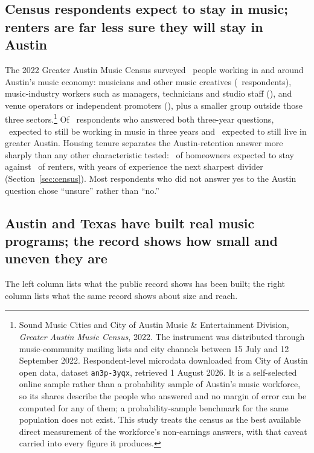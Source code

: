 \subsection*{Census respondents expect to stay in music; renters are far less sure they will stay in Austin}

The 2022 Greater Austin Music Census surveyed \NCensusNRespondents\ people
working in and around Austin's music economy: musicians and other music
creatives (\NCensusNSectorCreative\ respondents), music-industry workers such
as managers, technicians and studio staff (\NCensusNSectorIndustry), and venue
operators or independent promoters (\NCensusNSectorPresenter), plus a smaller
group outside those three sectors.\footnote{Sound Music Cities and City of
Austin Music \& Entertainment Division, \textit{Greater Austin Music Census},
2022. The instrument was distributed through music-community mailing lists and
city channels between 15 July and 12 September 2022. Respondent-level microdata
downloaded from City of Austin open data, dataset \texttt{an3p-3yqx}, retrieved
1 August 2026. It is a self-selected online sample rather than a probability
sample of Austin's music workforce, so its shares describe the people who
answered and no margin of error can be computed for any of them; a
probability-sample benchmark for the same population does not exist. This study
treats the census as the best available direct measurement of the workforce's
non-earnings answers, with that caveat carried into every figure it produces.}
Of \NCensusRetentionDenom\ respondents who answered both three-year questions,
\NCensusIntendContinueMusic\ expected to still be working in music in three
years and \NCensusIntendStayAustin\ expected to still live in greater Austin.
Housing tenure separates the Austin-retention answer more sharply than any other
characteristic tested:
\NCensusStayHousingTenureHomeowner\ of homeowners expected to stay against
\NCensusStayHousingTenureRenter\ of renters, with years of experience the next
sharpest divider (Section~\ref{sec:census}). Most respondents who did not
answer yes to the Austin question chose ``unsure'' rather than ``no.''

\subsection*{Austin and Texas have built real music programs; the record shows how small and uneven they are}

The left column lists what the public record shows has been built; the right
column lists what the same record shows about size and reach.

